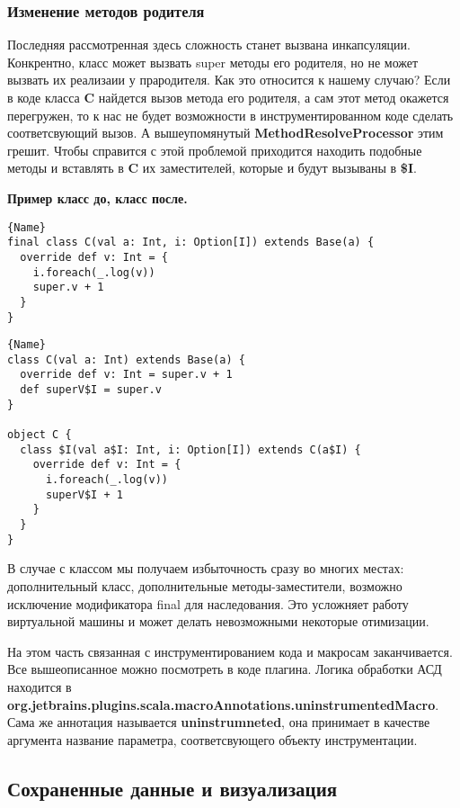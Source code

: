 \subsubsection{Изменение методов родителя}

Последняя рассмотренная здесь сложность станет вызвана инкапсуляции.
Конкрентно, класс может вызвать super методы его родителя, но не может вызвать
их реализаии у прародителя.
Как это относится к нашему случаю?
Если в коде класса \textbf{C} найдется вызов метода его родителя,
а сам этот метод окажется перегружен, то к нас не будет возможности в
инструментированном коде сделать соответсвующий вызов.
А вышеупомянутый \textbf{MethodResolveProcessor} этим грешит.
Чтобы справится с этой проблемой приходится находить подобные методы и
вставлять в \textbf{C} их заместителей, которые и будут вызываны в \textbf{\$I}.

\textbf{Пример класс до, класс после.}

\begin{lstlisting}[caption={До применения макроса}]{Name}
final class C(val a: Int, i: Option[I]) extends Base(a) {
  override def v: Int = {
    i.foreach(_.log(v))
    super.v + 1
  }
}
\end{lstlisting}

\begin{lstlisting}[caption={После применения макроса}]{Name}
class C(val a: Int) extends Base(a) {
  override def v: Int = super.v + 1
  def superV$I = super.v
}

object C {
  class $I(val a$I: Int, i: Option[I]) extends C(a$I) {
    override def v: Int = {
      i.foreach(_.log(v))
      superV$I + 1
    }
  }
}
\end{lstlisting}

В случае с классом мы получаем избыточность сразу во многих местах:
дополнительный класс, дополнительные методы-заместители, возможно исключение
модификатора final для наследования.
Это усложняет работу виртуальной машины и может делать невозможными некоторые
отимизации.

На этом часть связанная с инструментированием кода и макросам заканчивается.
Все вышеописанное можно посмотреть в коде плагина.
Логика обработки АСД находится в
\textbf{org.jetbrains.plugins.scala.macroAnnotations.uninstrumentedMacro}.
Сама же аннотация называется \textbf{uninstrumneted}, она принимает в качестве
аргумента название параметра, соответсвующего объекту инструментации.

\subsection{Сохраненные данные и визуализация}
\label{sec:data}

